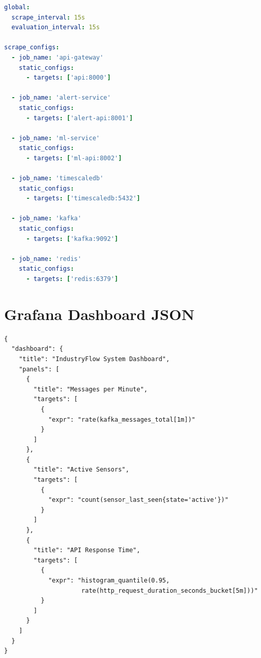 \begin{lstlisting}[language=yaml, caption={prometheus.yml}]
global:
  scrape_interval: 15s
  evaluation_interval: 15s

scrape_configs:
  - job_name: 'api-gateway'
    static_configs:
      - targets: ['api:8000']

  - job_name: 'alert-service'
    static_configs:
      - targets: ['alert-api:8001']

  - job_name: 'ml-service'
    static_configs:
      - targets: ['ml-api:8002']

  - job_name: 'timescaledb'
    static_configs:
      - targets: ['timescaledb:5432']

  - job_name: 'kafka'
    static_configs:
      - targets: ['kafka:9092']

  - job_name: 'redis'
    static_configs:
      - targets: ['redis:6379']
\end{lstlisting}

\section{Grafana Dashboard JSON}

\begin{lstlisting}[caption={system\_dashboard.json (фрагмент)}]
{
  "dashboard": {
    "title": "IndustryFlow System Dashboard",
    "panels": [
      {
        "title": "Messages per Minute",
        "targets": [
          {
            "expr": "rate(kafka_messages_total[1m])"
          }
        ]
      },
      {
        "title": "Active Sensors",
        "targets": [
          {
            "expr": "count(sensor_last_seen{state='active'})"
          }
        ]
      },
      {
        "title": "API Response Time",
        "targets": [
          {
            "expr": "histogram_quantile(0.95, 
                     rate(http_request_duration_seconds_bucket[5m]))"
          }
        ]
      }
    ]
  }
}
\end{lstlisting}

